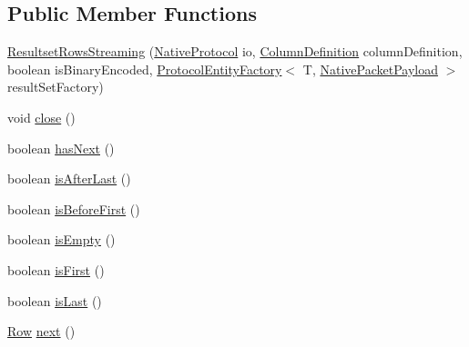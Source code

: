 \subsection*{Public Member Functions}
\begin{DoxyCompactItemize}
\item 
\mbox{\hyperlink{classcom_1_1mysql_1_1cj_1_1protocol_1_1a_1_1result_1_1_resultset_rows_streaming_a2fd06d15f9d59ed1e807189b556357f4}{Resultset\+Rows\+Streaming}} (\mbox{\hyperlink{classcom_1_1mysql_1_1cj_1_1protocol_1_1a_1_1_native_protocol}{Native\+Protocol}} io, \mbox{\hyperlink{interfacecom_1_1mysql_1_1cj_1_1protocol_1_1_column_definition}{Column\+Definition}} column\+Definition, boolean is\+Binary\+Encoded, \mbox{\hyperlink{interfacecom_1_1mysql_1_1cj_1_1protocol_1_1_protocol_entity_factory}{Protocol\+Entity\+Factory}}$<$ T, \mbox{\hyperlink{classcom_1_1mysql_1_1cj_1_1protocol_1_1a_1_1_native_packet_payload}{Native\+Packet\+Payload}} $>$ result\+Set\+Factory)
\item 
void \mbox{\hyperlink{classcom_1_1mysql_1_1cj_1_1protocol_1_1a_1_1result_1_1_resultset_rows_streaming_ae16b87b06548b980f3b0e3d9df020296}{close}} ()
\item 
boolean \mbox{\hyperlink{classcom_1_1mysql_1_1cj_1_1protocol_1_1a_1_1result_1_1_resultset_rows_streaming_aaa49f432c3992ae2bbe56bbc4c273fb8}{has\+Next}} ()
\item 
boolean \mbox{\hyperlink{classcom_1_1mysql_1_1cj_1_1protocol_1_1a_1_1result_1_1_resultset_rows_streaming_a87d9941d48a1d379d2387082904ebe6c}{is\+After\+Last}} ()
\item 
boolean \mbox{\hyperlink{classcom_1_1mysql_1_1cj_1_1protocol_1_1a_1_1result_1_1_resultset_rows_streaming_aea0a6d7632abca3ff7a6f6d69412c011}{is\+Before\+First}} ()
\item 
boolean \mbox{\hyperlink{classcom_1_1mysql_1_1cj_1_1protocol_1_1a_1_1result_1_1_resultset_rows_streaming_a477080ab4c378e7bf32d5c1230ecedbe}{is\+Empty}} ()
\item 
boolean \mbox{\hyperlink{classcom_1_1mysql_1_1cj_1_1protocol_1_1a_1_1result_1_1_resultset_rows_streaming_a723004a61b6ca61f2da79c7876c62502}{is\+First}} ()
\item 
boolean \mbox{\hyperlink{classcom_1_1mysql_1_1cj_1_1protocol_1_1a_1_1result_1_1_resultset_rows_streaming_abe926437ff8f266271a0e2403404dbc4}{is\+Last}} ()
\item 
\mbox{\hyperlink{interfacecom_1_1mysql_1_1cj_1_1result_1_1_row}{Row}} \mbox{\hyperlink{classcom_1_1mysql_1_1cj_1_1protocol_1_1a_1_1result_1_1_resultset_rows_streaming_a2150a98917c9542a703991059ebd369f}{next}} ()

\end{DoxyCompactItemize}
